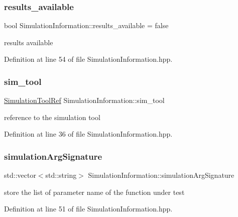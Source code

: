 \subsubsection{\texorpdfstring{results\+\_\+available}{results\_available}}
{\footnotesize\ttfamily bool Simulation\+Information\+::results\+\_\+available = false}



results available 



Definition at line 54 of file Simulation\+Information.\+hpp.

\mbox{\label{classSimulationInformation_ada96b770254fdb82fe8236952f19b79d}} 
\subsubsection{\texorpdfstring{sim\+\_\+tool}{sim\_tool}}
{\footnotesize\ttfamily \hyperlink{SimulationTool_8hpp_ac6ee25f5bd64bf5c2795c731e142d3c6}{Simulation\+Tool\+Ref} Simulation\+Information\+::sim\+\_\+tool}



reference to the simulation tool 



Definition at line 36 of file Simulation\+Information.\+hpp.

\mbox{\label{classSimulationInformation_acd59782d6a20b7a0f94345507d9544f5}} 
\subsubsection{\texorpdfstring{simulation\+Arg\+Signature}{simulationArgSignature}}
{\footnotesize\ttfamily std\+::vector$<$std\+::string$>$ Simulation\+Information\+::simulation\+Arg\+Signature}



store the list of parameter name of the function under test 



Definition at line 51 of file Simulation\+Information.\+hpp.

